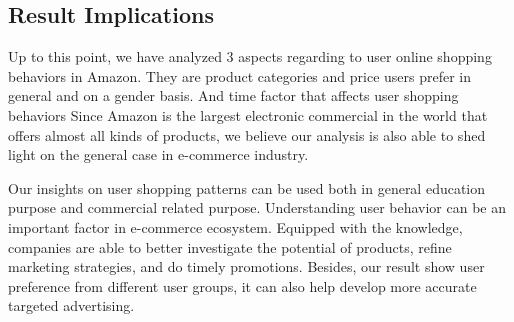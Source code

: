 \subsection{Result Implications}
Up to this point, we have analyzed 3 aspects regarding to user online shopping behaviors in Amazon. They are product categories and price users prefer in general and on a gender basis. And time factor that affects user shopping behaviors Since Amazon is the largest electronic commercial in the world that offers almost all kinds of products, we believe our analysis is also able to shed light on the general case in e-commerce industry. 

Our insights on user shopping patterns can be used both in general education purpose and commercial related purpose. Understanding user behavior can be an important factor in e-commerce ecosystem. Equipped with the knowledge, companies are able to better investigate the potential of products, refine marketing strategies, and do timely promotions. Besides, our result show user preference from different user groups, it can also help develop more accurate targeted advertising.

